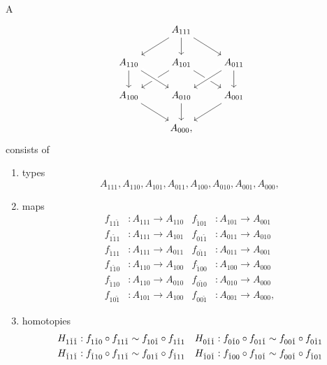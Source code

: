 \begin{defn}\label{defn:cube}
A 
\begin{equation*}
\begin{tikzcd}
& A_{111} \arrow[dl] \arrow[dr] \arrow[d] \\
A_{110} \arrow[d] & A_{101} \arrow[dl] \arrow[dr] & A_{011} \arrow[dl,crossing over] \arrow[d] \\
A_{100} \arrow[dr] & A_{010} \arrow[d] \arrow[from=ul,crossing over] & A_{001} \arrow[dl] \\
& A_{000},
\end{tikzcd}
\end{equation*}
consists of 
\begin{enumerate}
\item types
\begin{equation*}
A_{111},A_{110},A_{101},A_{011},A_{100},A_{010},A_{001},A_{000},
\end{equation*}
\item \begin{samepage}%
maps
\begin{align*}
f_{11\check{1}} & : A_{111}\to A_{110} & f_{\check{1}01} & : A_{101}\to A_{001} \\
f_{1\check{1}1} & : A_{111}\to A_{101} & f_{01\check{1}} & : A_{011}\to A_{010} \\
f_{\check{1}11} & : A_{111}\to A_{011} & f_{0\check{1}1} & : A_{011}\to A_{001} \\
f_{1\check{1}0} & : A_{110}\to A_{100} & f_{\check{1}00} & : A_{100}\to A_{000} \\
f_{\check{1}10} & : A_{110}\to A_{010} & f_{0\check{1}0} & : A_{010}\to A_{000} \\
f_{10\check{1}} & : A_{101}\to A_{100} & f_{00\check{1}} & : A_{001}\to A_{000},
\end{align*}
\end{samepage}%
\item homotopies
\begin{align*}
H_{1\check{1}\check{1}} & : f_{1\check{1}0}\circ f_{11\check{1}} \htpy f_{10\check{1}}\circ f_{1\check{1}1} & H_{0\check{1}\check{1}} & : f_{0\check{1}0}\circ f_{01\check{1}} \htpy f_{00\check{1}}\circ f_{0\check{1}1} \\
H_{\check{1}1\check{1}} & : f_{\check{1}10}\circ f_{11\check{1}} \htpy f_{01\check{1}}\circ f_{\check{1}11} & H_{\check{1}0\check{1}} & : f_{\check{1}00}\circ f_{10\check{1}} \htpy f_{00\check{1}}\circ f_{\check{1}01} \\

\end{align*}
\end{enumerate}
\end{defn}
